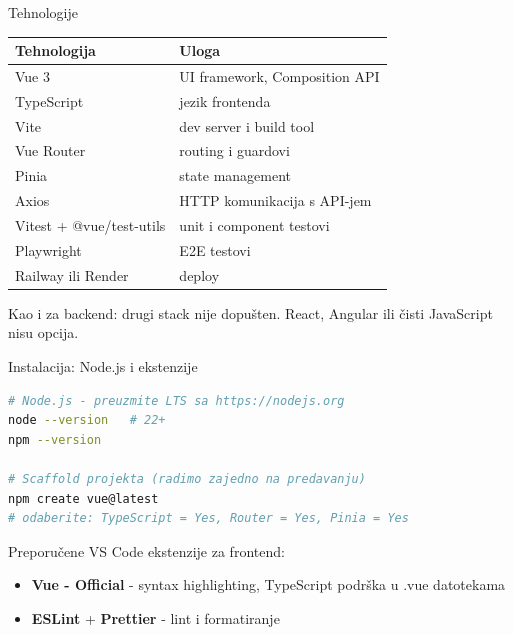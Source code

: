 \begin{frame}{Tehnologije}
\begin{tabular}{@{}lp{7cm}@{}}
  \toprule
  \textbf{Tehnologija} & \textbf{Uloga} \\
  \midrule
  Vue 3 & UI framework, Composition API \\
  TypeScript & jezik frontenda \\
  Vite & dev server i build tool \\
  Vue Router & routing i guardovi \\
  Pinia & state management \\
  Axios & HTTP komunikacija s API-jem \\
  Vitest + @vue/test-utils & unit i component testovi \\
  Playwright & E2E testovi \\
  Railway ili Render & deploy \\
  \bottomrule
\end{tabular}

\vspace{0.4em}
Kao i za backend: drugi stack nije dopušten. React, Angular ili čisti JavaScript nisu opcija.
\end{frame}

\begin{frame}[fragile,shrink=5]{Instalacija: Node.js i ekstenzije}
\begin{lstlisting}[language=bash]
# Node.js - preuzmite LTS sa https://nodejs.org
node --version   # 22+
npm --version

# Scaffold projekta (radimo zajedno na predavanju)
npm create vue@latest
# odaberite: TypeScript = Yes, Router = Yes, Pinia = Yes
\end{lstlisting}

\vspace{0.6em}
Preporučene VS Code ekstenzije za frontend:
\begin{itemize}
  \item \textbf{Vue - Official} - syntax highlighting, TypeScript podrška u .vue datotekama
  \item \textbf{ESLint} + \textbf{Prettier} - lint i formatiranje
\end{itemize}
\end{frame}

